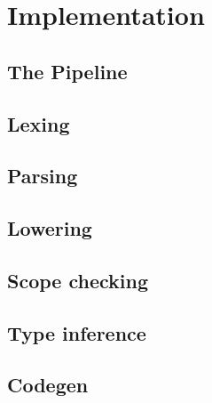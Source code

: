 \chapter{Implementation}\label{chapter:implementation}

\section{The Pipeline}\label{section:implementation:pipeline}
\section{Lexing}\label{section:implementation:lexing}
\section{Parsing}\label{section:implementation:parsing}
\section{Lowering}\label{section:implementation:lowering}
\section{Scope checking}\label{section:implementation:scope_checking}
\section{Type inference}\label{section:implementation:type_inference}
\section{Codegen}\label{section:implementation:codegen}
